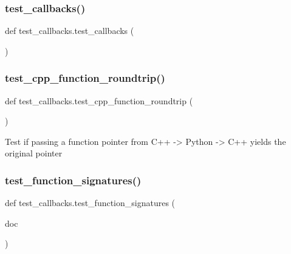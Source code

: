 \mbox{\label{namespacetest__callbacks_aae473d03c5d0afa46ec840f897be8b8d}} 
\subsubsection{\texorpdfstring{test\_callbacks()}{test\_callbacks()}}
{\footnotesize\ttfamily def test\+\_\+callbacks.\+test\+\_\+callbacks (\begin{DoxyParamCaption}{ }\end{DoxyParamCaption})}

\mbox{\label{namespacetest__callbacks_a8986001a0e43924db55c88c589c89a3f}} 
\subsubsection{\texorpdfstring{test\_cpp\_function\_roundtrip()}{test\_cpp\_function\_roundtrip()}}
{\footnotesize\ttfamily def test\+\_\+callbacks.\+test\+\_\+cpp\+\_\+function\+\_\+roundtrip (\begin{DoxyParamCaption}{ }\end{DoxyParamCaption})}

\begin{DoxyVerb}Test if passing a function pointer from C++ -> Python -> C++ yields the original pointer\end{DoxyVerb}
 \mbox{\label{namespacetest__callbacks_afbaf14de2b05df41c6e7b686c68e2519}} 
\subsubsection{\texorpdfstring{test\_function\_signatures()}{test\_function\_signatures()}}
{\footnotesize\ttfamily def test\+\_\+callbacks.\+test\+\_\+function\+\_\+signatures (\begin{DoxyParamCaption}\item[{}]{doc }\end{DoxyParamCaption})}

